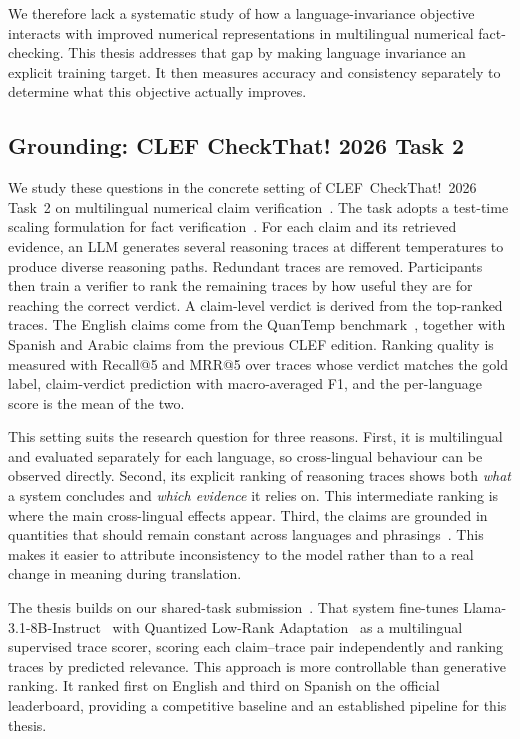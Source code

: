 We therefore lack a systematic study of how a language-invariance objective interacts with improved
numerical representations in multilingual numerical fact-checking. This thesis addresses that gap by
making language invariance an explicit training target. It then measures accuracy and consistency
separately to determine what this objective actually improves.

\subsection{Grounding: CLEF CheckThat! 2026 Task 2}
\label{sec:grounding}

We study these questions in the concrete setting of CLEF~CheckThat!~2026 Task~2 on multilingual
numerical claim verification~\cite{clef-checkthat:2026:task2}. The task adopts a test-time scaling
formulation for fact verification~\cite{chungkham2025thinkrightmoretesttime}. For each claim and its
retrieved evidence, an LLM generates several reasoning traces at different temperatures to produce
diverse reasoning paths. Redundant traces are removed. Participants then train a verifier to rank the
remaining traces by how useful they are for reaching the correct verdict. A claim-level verdict is
derived from the top-ranked traces. The English claims come from the QuanTemp
benchmark~\cite{v2024quantemprealworldopendomainbenchmark}, together with Spanish and Arabic claims
from the previous CLEF edition. Ranking quality is measured with Recall@5 and MRR@5 over traces whose
verdict matches the gold label, claim-verdict prediction with macro-averaged F1, and the per-language
score is the mean of the two.

This setting suits the research question for three reasons. First, it is multilingual and evaluated
separately for each language, so cross-lingual behaviour can be observed directly. Second, its
explicit ranking of reasoning traces shows both \emph{what} a system concludes and \emph{which
evidence} it relies on. This intermediate ranking is where the main cross-lingual effects appear.
Third, the claims are grounded in quantities that should remain constant across languages and
phrasings~\cite{lewkowycz2022solvingquantitativereasoningproblems}. This makes it easier to attribute
inconsistency to the model rather than to a real change in meaning during translation.

The thesis builds on our shared-task submission~\cite{khawaja2026gipplab}. That system fine-tunes
Llama-3.1-8B-Instruct~\cite{llama31instruct} with Quantized Low-Rank
Adaptation~\cite{dettmers2023qloraefficientfinetuningquantized,hu2021loralowrankadaptationlarge} as a
multilingual supervised trace scorer, scoring each claim--trace pair independently and ranking traces
by predicted relevance. This approach is more controllable than generative ranking. It ranked first
on English and third on Spanish on the official leaderboard, providing a competitive baseline and an
established pipeline for this thesis.

